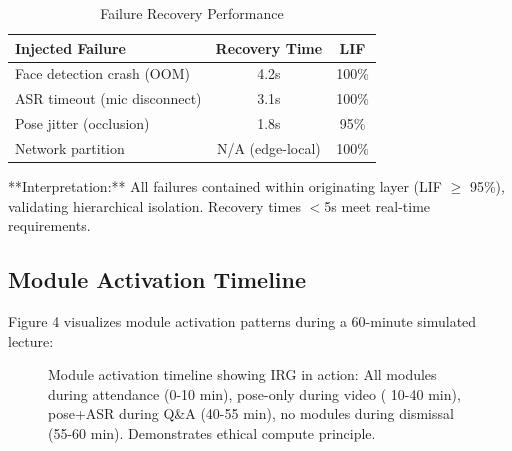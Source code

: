\documentclass[conference]{IEEEtran}
\begin{document}
\begin{table}[htbp]
\caption{Failure Recovery Performance}
\begin{center}
\begin{tabular}{lcc}
\toprule
\textbf{Injected Failure} & \textbf{Recovery Time} & \textbf{LIF} \\
\midrule
Face detection crash (OOM) & 4.2s & 100\% \\
ASR timeout (mic disconnect) & 3.1s & 100\% \\
Pose jitter (occlusion) & 1.8s & 95\% \\
Network partition & N/A (edge-local) & 100\% \\
\bottomrule
\end{tabular}
\end{center}
\end{table}

**Interpretation:** All failures contained within originating layer (LIF $\geq$ 95\%), validating hierarchical isolation. Recovery times $<$5s meet real-time requirements.

\subsection{Module Activation Timeline}
Figure 4 visualizes module activation patterns during a 60-minute simulated lecture:


\begin{figure}[htbp]
\centering
{}

\caption{Module activation timeline showing IRG in action: All modules during attendance (0-10 min), pose-only during video ( 10-40 min), pose+ASR during Q\&A (40-55 min), no modules during dismissal (55-60 min). Demonstrates ethical compute principle.}
\label{fig:timeline}
\end{figure}
\end{document}

